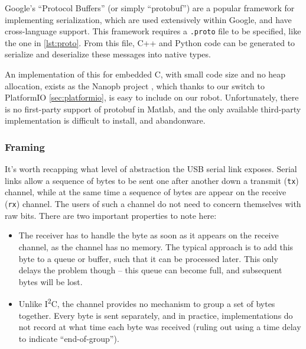 \documentclass[main.tex]{subfiles}
\begin{document}
		Google’s \enquote{Protocol Buffers}\cite{protobuf} (or simply \enquote{protobuf}) are a popular framework for implementing serialization, which are used extensively within Google, and have cross-language support.
		This framework requires a \texttt{.proto} file to be specified, like the one in \cref{lst:proto}.
		From this file, C++ and Python code can be generated to serialize and deserialize these messages into native types.

		An implementation of this for embedded C, with small code size and no heap allocation, exists as the Nanopb project \cite{nanopb}, which thanks to our switch to PlatformIO \cref{sec:platformio}, is easy to include on our robot.
		Unfortunately, there is no first-party support of protobuf in Matlab, and the only available third-party implementation \cite{protobuf-matlab} is difficult to install, and abandonware.\footnotemark


	\subsubsection{Framing}

		It's worth recapping what level of abstraction the USB serial link exposes.
		Serial links allow a sequence of bytes to be sent one after another down a transmit (\texttt{tx}) channel, while at the same time a sequence of bytes are appear on the receive (\texttt{rx}) channel. The users of such a channel do not need to concern themselves with raw bits. There are two important properties to note here:
		\begin{itemize}[noitemsep]
			\item
				The receiver has to handle the byte as soon as it appears on the receive channel, as the channel has no memory.
				The typical approach is to add this byte to a queue or buffer, such that it can be processed later.
				This only delays the problem though -- this queue can become full, and subsequent bytes will be lost.
			\item
				Unlike I\textsuperscript{2}C, the channel provides no mechanism to group a set of bytes together.
				Every byte is sent separately, and in practice, implementations do not record at what time each byte was received (ruling out using a time delay to indicate \enquote{end-of-group}).
		\end{itemize}
\end{document}
